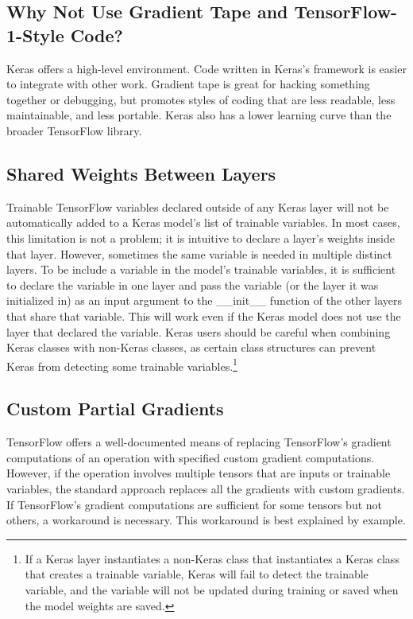 \subsection{Why Not Use Gradient Tape and TensorFlow-1-Style Code?}
Keras offers a high-level environment. Code written in Keras's framework is easier to integrate with other work. Gradient tape is great for hacking something together or debugging, but promotes styles of coding that are less readable, less maintainable, and less portable. Keras also has a lower learning curve than the broader TensorFlow library.


\subsection{Shared Weights Between Layers}
Trainable TensorFlow variables declared outside of any Keras layer will not be automatically added to a Keras model's list of trainable variables. In most cases, this limitation is not a problem; it is intuitive to declare a layer's weights inside that layer. However, sometimes the same variable is needed in multiple distinct layers. To be include a variable in the model's trainable variables, it is sufficient to declare the variable in one layer and pass the variable (or the layer it was initialized in) as an input argument to the \_\_init\_\_ function of the other layers that share that variable. This will work even if the Keras model does not use the layer that declared the variable. Keras users should be careful when combining Keras classes with non-Keras classes, as certain class structures can prevent Keras from detecting some trainable variables.\footnote{If a Keras layer instantiates a non-Keras class that instantiates a Keras class that creates a trainable variable, Keras will fail to detect the trainable variable, and the variable will not be updated during training or saved when the model weights are saved.}

\subsection{Custom Partial Gradients}
TensorFlow offers a well-documented means of replacing TensorFlow's gradient computations of an operation with specified custom gradient computations. However, if the operation involves multiple tensors that are inputs or trainable variables, the standard approach replaces all the gradients with custom gradients. If TensorFlow's gradient computations are sufficient for some tensors but not others, a workaround is necessary. This workaround is best explained by example.

